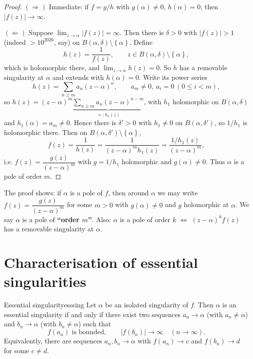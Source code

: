 \documentclass[11pt,openany]{report}
\newcommand{\abs}[1]{\left\lvert #1 \right\rvert}
\newcommand{\set}[1]{\left\{ #1 \right\}}
\begin{document}
\begin{proof}
$(\Rightarrow)$ Immediate: if $f=g/h$ with $g(\alpha)\ne0$, $h(\alpha)=0$, then
$\abs{f(z)}\to\infty$.

$(\Leftarrow)$ Suppose $\lim_{z\to\alpha}\abs{f(z)}=\infty$. Then there is $\delta>0$ with
$\abs{f(z)}>1$ (indeed $>10^{2026}$, say) on $B(\alpha,\delta)\setminus\set\alpha$. Define
\[
  h(z) = \frac{1}{f(z)}, \qquad z\in B(\alpha,\delta)\setminus\set\alpha,
\]
which is holomorphic there, and $\lim_{z\to\alpha}h(z)=0$. So $h$ has a removable
singularity at $\alpha$ and extends with $h(\alpha)=0$. Write its power series
\[
  h(z) = \sum_{n\ge m} a_n (z-\alpha)^n, \qquad a_m\ne0,\ a_i=0\ (0\le i<m),
\]
so $h(z) = (z-\alpha)^m\underbrace{\sum_{n\ge m} a_n (z-\alpha)^{n-m}}_{=:h_1(z)}$, with
$h_1$ holomorphic on $B(\alpha,\delta)$ and $h_1(\alpha)=a_m\ne0$. Hence there is
$\delta'>0$ with $h_1\ne0$ on $B(\alpha,\delta')$, so $1/h_1$ is holomorphic there. Then on
$B(\alpha,\delta')\setminus\set\alpha$,
\[
  f(z) = \frac{1}{h(z)} = \frac{1}{(z-\alpha)^m h_1(z)}
  = \frac{1/h_1(z)}{(z-\alpha)^m},
\]
i.e. $f(z)=\dfrac{g(z)}{(z-\alpha)^m}$ with $g=1/h_1$ holomorphic and $g(\alpha)\ne0$. Thus
$\alpha$ is a pole of order $m$.
\end{proof}

\begin{remark}
The proof shows: if $\alpha$ is a pole of $f$, then around $\alpha$ we may write
$f(z)=\dfrac{g(z)}{(z-\alpha)^m}$ for some $m>0$ with $g(\alpha)\ne0$ and $g$ holomorphic at
$\alpha$. We say $\alpha$ is a pole of \textbf{``order $m$''}. Also:
$\alpha$ is a pole of order $k$ $\Longleftrightarrow$ $(z-\alpha)^k f(z)$ has a removable
singularity at $\alpha$.
\end{remark}

\section{Characterisation of essential singularities}

\begin{theorem}{Essential singularity}{esssing}
Let $\alpha$ be an isolated singularity of $f$. Then $\alpha$ is an essential singularity
if and only if there exist two sequences $a_n\to\alpha$ (with $a_n\ne\alpha$) and
$b_n\to\alpha$ (with $b_n\ne\alpha$) such that
\[
  f(a_n) \text{ is bounded}, \qquad \abs{f(b_n)}\to\infty \quad(n\to\infty).
\]
Equivalently, there are sequences $a_n,b_n\to\alpha$ with $f(a_n)\to c$ and $f(b_n)\to d$
for some $c\ne d$.
\end{theorem}
\end{document}
